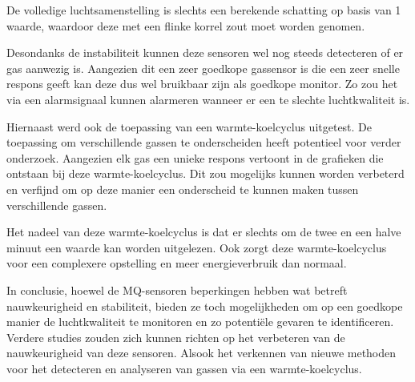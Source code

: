 De volledige luchtsamenstelling is slechts een berekende schatting op basis van 1 waarde, waardoor deze met een flinke korrel zout moet worden genomen.

Desondanks de instabiliteit kunnen deze sensoren wel nog steeds detecteren of er gas aanwezig is. Aangezien dit een zeer goedkope gassensor is die een zeer snelle respons geeft kan deze dus wel bruikbaar zijn als goedkope monitor. Zo zou het via een alarmsignaal kunnen alarmeren wanneer er een te slechte luchtkwaliteit is.

Hiernaast werd ook de toepassing van een warmte-koelcyclus uitgetest.
De toepassing om verschillende gassen te onderscheiden heeft potentieel voor verder onderzoek. Aangezien elk gas een unieke respons vertoont in de grafieken die ontstaan bij deze warmte-koelcyclus. Dit zou mogelijks kunnen worden verbeterd en verfijnd om op deze manier een onderscheid te kunnen maken tussen verschillende gassen.

Het nadeel van deze warmte-koelcyclus is dat er slechts om de twee en een halve minuut een waarde kan worden uitgelezen. Ook zorgt deze warmte-koelcyclus voor een complexere opstelling en meer energieverbruik dan normaal.



In conclusie, hoewel de MQ-sensoren beperkingen hebben wat betreft nauwkeurigheid en stabiliteit, bieden ze toch mogelijkheden om op een goedkope manier de luchtkwaliteit te monitoren en zo potentiële gevaren te identificeren. Verdere studies zouden zich kunnen richten op het verbeteren van de nauwkeurigheid van deze sensoren. Alsook het verkennen van nieuwe methoden voor het detecteren en analyseren van gassen via een warmte-koelcyclus.







